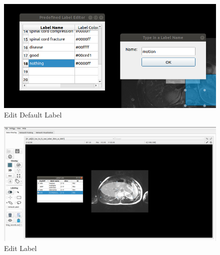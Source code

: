 \documentclass[12pt]{article}
\begin{document}
\begin{figure}[htbp]	
	\centering
	\includegraphics[width=\linewidth]{edit_default_label.png}
	\caption[Edit Default Label]{Edit Default Label}
	\label{fig:edit_default_label}
\end{figure}
\begin{figure}[htbp]	
	\centering
	\includegraphics[width=\linewidth]{edit_label.png}
	\caption[Edit Label]{Edit Label}
	\label{fig:edit_label}
\end{figure}	
\end{document}
